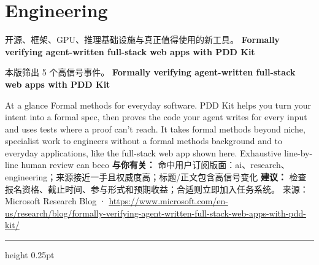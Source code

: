 \documentclass[10.5pt]{ctexart}
\begin{document}
\section*{Engineering}
{\color{ormuted} 开源、框架、GPU、推理基础设施与真正值得使用的新工具。}
\vspace{2mm}
{\LARGE\bfseries Formally verifying agent-written full-stack web apps with PDD Kit}\par
\vspace{1mm}
{\color{ormuted} 本版筛出 5 个高信号事件。}
\vspace{3mm}
{\Large\bfseries Formally verifying agent-written full-stack web apps with PDD Kit}\par
At a glance Formal methods for everyday software. PDD Kit helps you turn your intent into a formal spec, then proves the code your agent writes for every input and uses tests where a proof can’t reach. It takes formal methods beyond niche, specialist work to engineers without a formal methods background and to everyday applications, like the full-stack web app shown here. Exhaustive line-by-line human review can beco
\textbf{与你有关：} 命中用户订阅版面：ai、research、engineering；来源接近一手且权威度高；标题/正文包含高信号变化
\textbf{建议：} 检查报名资格、截止时间、参与形式和预期收益；合适则立即加入任务系统。
{\footnotesize\color{ormuted} 来源：Microsoft Research Blog · \url{https://www.microsoft.com/en-us/research/blog/formally-verifying-agent-written-full-stack-web-apps-with-pdd-kit/}}
\vspace{4mm}
\hrule height 0.25pt
\vspace{3mm}
\end{document}

